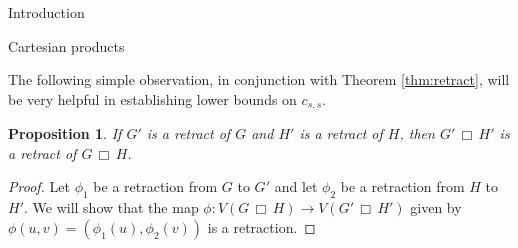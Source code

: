\documentclass[12pt]{amsart}
\newtheorem{theorem}[lemma]{Theorem}
\newtheorem{proposition}[lemma]{Proposition}
\theoremstyle{definition}
\def\cart{\, \Box \,}
\newcommand{\speeds}{c_{s,s}}
\begin{document}
\begin{section}{Introduction}
\begin{section}{Cartesian products}

The following simple observation, in conjunction with Theorem \ref{thm:retract}, will be very helpful in establishing lower bounds on $\speeds$.

\begin{proposition}\label{prop:cartesian_retract}
If $G'$ is a retract of $G$ and $H'$ is a retract of $H$, then $G'\cart H'$ is a retract of $G\cart H$.
\end{proposition}

\begin{proof}
Let $\phi_1$ be a retraction from $G$ to $G'$ and let $\phi_2$ be a retraction from $H$ to $H'$.  We will show that the map $\phi:V(G\cart H)\to V(G'\cart H')$ given by $\phi(u,v)=\left(\phi_1(u),\phi_2(v)\right)$ is a retraction.


\end{proof}
\end{section}
\end{section}
\end{document}
